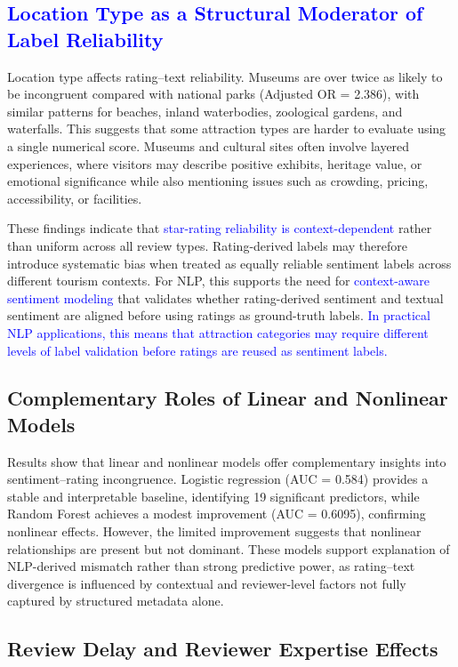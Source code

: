 \documentclass[conference]{IEEEtran}
\newcommand{\changed}[1]{\textcolor{blue}{#1}}
\begin{document}
\subsection{\changed{Location Type as a Structural Moderator of Label Reliability}}
Location type affects rating–text reliability. Museums are over twice as likely to be incongruent compared with national parks (Adjusted OR = 2.386), with similar patterns for beaches, inland waterbodies, zoological gardens, and waterfalls. This suggests that some attraction types are harder to evaluate using a single numerical score. Museums and cultural sites often involve layered experiences, where visitors may describe positive exhibits, heritage value, or emotional significance while also mentioning issues such as crowding, pricing, accessibility, or facilities.

These findings indicate that \changed{star-rating reliability is context-dependent} rather than uniform across all review types. Rating-derived labels may therefore introduce systematic bias when treated as equally reliable sentiment labels across different tourism contexts. For NLP, this supports the need for \changed{context-aware sentiment modeling} that validates whether rating-derived sentiment and textual sentiment are aligned before using ratings as ground-truth labels. \changed{In practical NLP applications, this means that attraction categories may require different levels of label validation before ratings are reused as sentiment labels.}

\subsection{Complementary Roles of Linear and Nonlinear Models}
Results show that linear and nonlinear models offer complementary insights into sentiment–rating incongruence. Logistic regression (AUC = 0.584) provides a stable and interpretable baseline, identifying 19 significant predictors, while Random Forest achieves a modest improvement (AUC = 0.6095), confirming nonlinear effects. However, the limited improvement suggests that nonlinear relationships are present but not dominant. These models support explanation of NLP-derived mismatch rather than strong predictive power, as rating–text divergence is influenced by contextual and reviewer-level factors not fully captured by structured metadata alone.


\subsection{Review Delay and Reviewer Expertise Effects}
\end{document}
